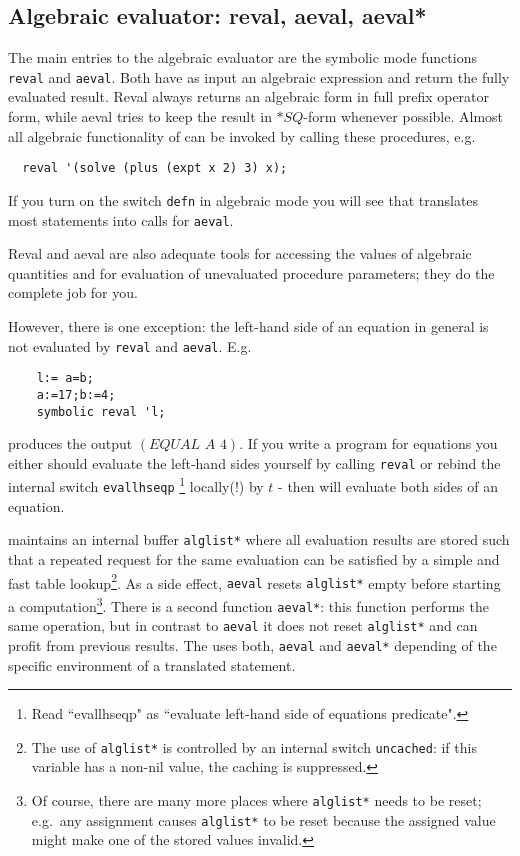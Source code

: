 \subsection{Algebraic evaluator: reval, aeval, aeval*}

The main entries to the algebraic evaluator are the 
symbolic mode functions {\tt reval} and 
{\tt aeval}.
Both have as input an algebraic expression 
and return the fully evaluated result. Reval always returns 
an algebraic form in full prefix operator form, while
aeval tries to keep the result in $*SQ$-form whenever
possible. Almost all algebraic functionality of {\reduce} can be
invoked by calling these procedures, e.g.

\begin{verbatim}
  reval '(solve (plus (expt x 2) 3) x);
\end{verbatim} 

If you turn on the switch {\tt defn} in algebraic mode
you will see that {\reduce} translates most statements
into calls for {\tt aeval}.

Reval and aeval are also adequate tools for accessing
the values of algebraic quantities and for evaluation of
unevaluated procedure parameters; they do the complete
job for you.

 However, there is one exception: 
the left-hand side of an equation in general is not
evaluated by {\tt reval} and {\tt aeval}. E.g.\  

\begin{verbatim}
    l:= a=b; 
    a:=17;b:=4;
    symbolic reval 'l;
\end{verbatim}
produces the output $(EQUAL\,\, A\,\, 4)$. If you write
a program for equations you either should evaluate
the left-hand sides yourself by calling {\tt reval}
or rebind the internal switch  {\tt *evallhseqp}
\footnote{Read ``evallhseqp" as ``evaluate left-hand side 
of equations predicate".}
locally(!) by $t$ - then {\reduce} will evaluate both sides
of an equation. 

{\reduce} maintains an internal buffer {\tt alglist*}
where all evaluation results are stored such that a repeated request
for the same evaluation can be satisfied by a simple and fast table 
lookup\footnote{The use of {\tt alglist*} is controlled by an internal
switch {\tt *uncached}: if this
variable has a non-nil value, the caching is suppressed.}. 
As a side effect, {\tt aeval} resets {\tt alglist*}
empty before starting a 
computation\footnote{Of course, there are many more places where {\tt alglist*}
needs to be reset; e.g.\  any assignment causes {\tt alglist*} to be
reset because the assigned value might make one of the stored values
invalid.}. There is a second function
{\tt aeval*}: this function performs the same
operation, but in contrast to {\tt aeval} it does not reset
{\tt alglist*} and can profit from previous results. The {\reduce}
uses both, {\tt aeval} and {\tt aeval*} depending of the specific
environment of a translated statement.
